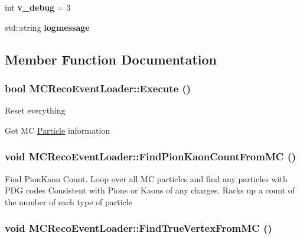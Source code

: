 \begin{DoxyCompactItemize}
\item 
\hypertarget{classMCRecoEventLoader_a1dd2e7e0076fafe88a4baa4218f772a0}{
int {\bfseries v\_\-debug} = 3}
\label{classMCRecoEventLoader_a1dd2e7e0076fafe88a4baa4218f772a0}

\item 
\hypertarget{classMCRecoEventLoader_a1c2cc6580cbfcad49ea1cd17e7ce08f3}{
std::string {\bfseries logmessage}}
\label{classMCRecoEventLoader_a1c2cc6580cbfcad49ea1cd17e7ce08f3}

\end{DoxyCompactItemize}


\subsection{Member Function Documentation}
\hypertarget{classMCRecoEventLoader_a17027f8a3689b459fa54a4a3c84b5a0c}{
\subsubsection[{Execute}]{\setlength{\rightskip}{0pt plus 5cm}bool MCRecoEventLoader::Execute ()}}
\label{classMCRecoEventLoader_a17027f8a3689b459fa54a4a3c84b5a0c}


Reset everything

Get MC \hyperlink{classParticle}{Particle} information \hypertarget{classMCRecoEventLoader_ade2e70b075295f19384e6862dda123ec}{
\subsubsection[{FindPionKaonCountFromMC}]{\setlength{\rightskip}{0pt plus 5cm}void MCRecoEventLoader::FindPionKaonCountFromMC ()}}
\label{classMCRecoEventLoader_ade2e70b075295f19384e6862dda123ec}


Find PionKaon Count. Loop over all MC particles and find any particles with PDG codes Consistent with Pions or Kaons of any charges. Racks up a count of the number of each type of particle \hypertarget{classMCRecoEventLoader_a981fbf41206f4be37c40ec5fbaeb9c9d}{
\subsubsection[{FindTrueVertexFromMC}]{\setlength{\rightskip}{0pt plus 5cm}void MCRecoEventLoader::FindTrueVertexFromMC ()}}
\label{classMCRecoEventLoader_a981fbf41206f4be37c40ec5fbaeb9c9d}


